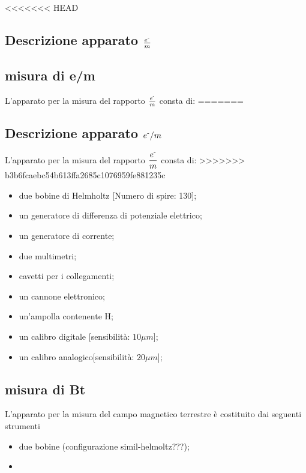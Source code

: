 <<<<<<< HEAD
\subsection{Descrizione apparato $\frac{e^{\textrm{-}}}{m}$}
\subsection{misura di e/m}
L'apparato per la misura del rapporto $\frac{e^{\textrm{-}}}{m}$ consta di:
=======
\subsection{Descrizione apparato $e^{\textrm{-}}/m$}
L'apparato per la misura del rapporto $\dfrac{e^{\textrm{-}}}{m}$ consta di:
>>>>>>> b3b6fcaebc54b613ffa2685c1076959fe881235c
\begin{itemize}
  \item due bobine di Helmholtz [Numero di spire: 130];
  \item un generatore di differenza di potenziale elettrico;
  \item un generatore di corrente;
  \item due multimetri;
  \item cavetti per i collegamenti;
  \item un cannone elettronico;
  \item un'ampolla contenente H;
  \item un calibro digitale [sensibilità: $10\mu m$];
  \item un calibro analogico[sensibilità: $20\mu m$];
\end{itemize}

\subsection{misura di Bt}
L'apparato per la misura del campo magnetico terrestre è costituito dai seguenti strumenti
\begin{itemize}
  \item due bobine (configurazione simil-helmoltz???);
  \item 
\end{itemize}

